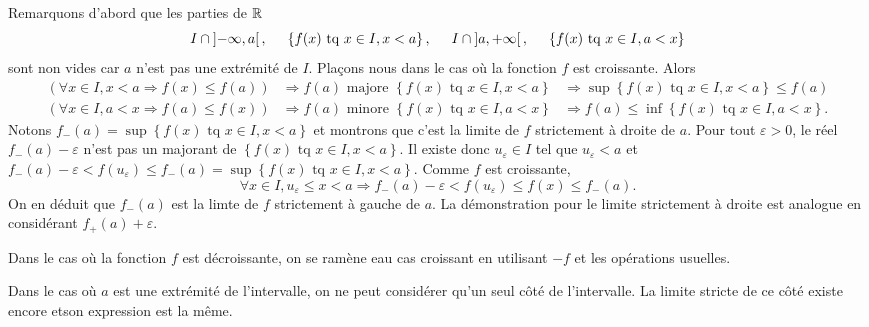 \begin{demo}
Remarquons d'abord que les parties de $\mathbb{R}$ 
\[
 I\cap \left] -\infty , a \right[ ,\hspace{0.5cm} \left\lbrace f(x) \text{ tq } x\in I, x < a \right\rbrace, \hspace{0.5cm} 
  I\cap \left] a, +\infty \right[ ,\hspace{0.5cm} \left\lbrace f(x) \text{ tq } x\in I, a < x\right\rbrace
\]
sont non vides car $a$ n'est pas une extrémité de $I$.\newline
Plaçons nous dans le cas où la fonction $f$ est croissante. Alors
\begin{align*}
 \left( \forall x \in I, x < a \Rightarrow f(x) \leq f(a)\right) 
 &\Rightarrow f(a) \text{ majore } \left\lbrace f(x) \text{ tq } x\in I, x < a \right\rbrace
 &\Rightarrow \sup \left\lbrace f(x) \text{ tq } x\in I, x < a \right\rbrace \leq f(a) \\
 \left( \forall x \in I, a < x \Rightarrow f(a) \leq f(x)\right) 
 &\Rightarrow f(a) \text{ minore } \left\lbrace f(x) \text{ tq } x\in I, a < x\right\rbrace 
 &\Rightarrow f(a)\leq  \inf\left\lbrace f(x) \text{ tq } x\in I, a < x\right\rbrace.
\end{align*}
Notons $f_-(a) = \sup \left\lbrace f(x) \text{ tq } x\in I, x < a \right\rbrace$ et montrons que c'est la limite de $f$ strictement à droite de $a$.\newline
Pour tout $\varepsilon >0$, le réel $f_-(a) - \varepsilon$ n'est pas un majorant de $\left\lbrace f(x) \text{ tq } x\in I, x < a \right\rbrace$. Il existe donc $u_\varepsilon \in I$ tel que $u_\varepsilon < a$ et $f_-(a) - \varepsilon < f(u_\varepsilon) \leq f_-(a) = \sup \left\lbrace f(x) \text{ tq } x\in I, x < a \right\rbrace$. Comme $f$ est croissante,
\[
 \forall x \in I, u_\varepsilon \leq x < a \Rightarrow f_-(a) - \varepsilon < f(u_\varepsilon) \leq f(x) \leq f_-(a).
\]
On en déduit que $f_-(a)$ est la limte de $f$ strictement à gauche de $a$. La démonstration pour le limite strictement à droite est analogue en considérant $f_+(a) + \varepsilon$.

Dans le cas où la fonction $f$ est décroissante, on se ramène eau cas croissant en utilisant $-f$ et les opérations usuelles.
\end{demo}
\begin{rem}
 Dans le cas où $a$ est une extrémité de l'intervalle, on ne peut considérer qu'un seul côté de l'intervalle. La limite stricte de ce côté existe encore etson expression est la même. 
\end{rem}

